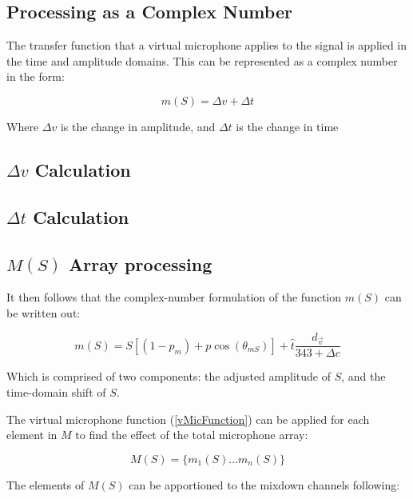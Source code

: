 \subsection{Processing as a Complex Number}

The transfer function that a virtual microphone applies to the signal is applied in the time and amplitude domains. This can be represented as a complex number in the form:

\begin{equation}\label{vMicFunction}
m(S) = \Delta{}v + \Delta{}t
\end{equation}

Where $\Delta v$ is the change in amplitude, and $\Delta t$ is the change in time

\subsection{$\Delta{}v$ Calculation}



\subsection{$\Delta{}t$ Calculation}



\subsection{$M(S)$ Array processing}

It then follows that the complex-number formulation of the function $m(S)$ can be written out:

\begin{equation}
	m(S) = S\left[\left(1 - p_m\right) + p\cos(\theta_{mS})\right] + \hat{t}\frac{d_{\vec{v}}}{343 + \Delta{}c}
\end{equation}

Which is comprised of two components: the adjusted amplitude of $S$, and the time-domain shift of $S$.

The virtual microphone function (\ref{vMicFunction}) can be applied for each element in $M$ to find the effect of the total microphone array:

\begin{equation}
M(S) = \{m_1(S) ... m_n(S)\}
\end{equation}

The elements of $M(S)$ can be apportioned to the mixdown channels following:

